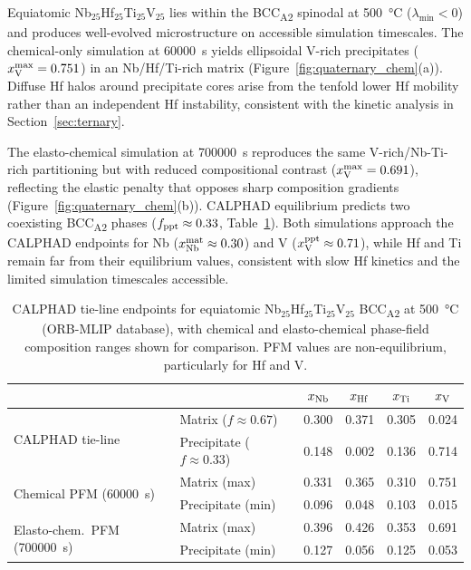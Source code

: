 {\color{blue}
Equiatomic Nb$_{25}$Hf$_{25}$Ti$_{25}$V$_{25}$ lies within the BCC\textsubscript{A2} spinodal at \SI{500}{\celsius} ($\lambda_{\min} < 0$) and produces well-evolved microstructure on accessible simulation timescales.
The chemical-only simulation at \SI{60000}{\second} yields ellipsoidal V-rich precipitates ($x_{\rm V}^{\rm max} = 0.751$) in an Nb/Hf/Ti-rich matrix (Figure~\ref{fig:quaternary_chem}(a)).
Diffuse Hf halos around precipitate cores arise from the tenfold lower Hf mobility rather than an independent Hf instability, consistent with the kinetic analysis in Section~\ref{sec:ternary}.

The elasto-chemical simulation at \SI{700000}{\second} reproduces the same V-rich/Nb-Ti-rich partitioning but with reduced compositional contrast ($x_{\rm V}^{\rm max} = 0.691$), reflecting the elastic penalty that opposes sharp composition gradients (Figure~\ref{fig:quaternary_chem}(b)).
CALPHAD equilibrium predicts two coexisting BCC\textsubscript{A2} phases ($f_{\rm ppt} \approx 0.33$, Table~\ref{tab:quaternary_tieline}).
Both simulations approach the CALPHAD endpoints for Nb ($x_{\rm Nb}^{\rm mat} \approx 0.30$) and V ($x_{\rm V}^{\rm ppt} \approx 0.71$), while Hf and Ti remain far from their equilibrium values, consistent with slow Hf kinetics and the limited simulation timescales accessible.
}

\begin{table}[!h]
    \centering
    \caption{%
        CALPHAD tie-line endpoints for equiatomic Nb$_{25}$Hf$_{25}$Ti$_{25}$V$_{25}$
        BCC\textsubscript{A2} at \SI{500}{\celsius} (ORB-MLIP database), with
        chemical and elasto-chemical phase-field composition ranges shown for
        comparison. PFM values are non-equilibrium, particularly for Hf and V.
    }
    \label{tab:quaternary_tieline}
    \scriptsize
    \renewcommand{\arraystretch}{1.0}
    \setlength{\tabcolsep}{5pt}
    \begin{tabular}{llcccc}
        \toprule
        & & $x_{\rm Nb}$ & $x_{\rm Hf}$ & $x_{\rm Ti}$ & $x_{\rm V}$ \\
        \midrule
        \multirow{2}{*}{CALPHAD tie-line}
            & Matrix ($f \approx 0.67$)
            & 0.300 & 0.371 & 0.305 & 0.024 \\
            & Precipitate ($f \approx 0.33$)
            & 0.148 & 0.002 & 0.136 & 0.714 \\
        \midrule
        \multirow{2}{*}{Chemical PFM (\SI{60000}{\second})}
            & Matrix (max)
            & 0.331 & 0.365 & 0.310 & 0.751 \\
            & Precipitate (min)
            & 0.096 & 0.048 & 0.103 & 0.015 \\
        \midrule
        \multirow{2}{*}{Elasto-chem.\ PFM (\SI{700000}{\second})}
            & Matrix (max)
            & 0.396 & 0.426 & 0.353 & 0.691 \\
            & Precipitate (min)
            & 0.127 & 0.056 & 0.125 & 0.053 \\
        \bottomrule
    \end{tabular}
\end{table}

